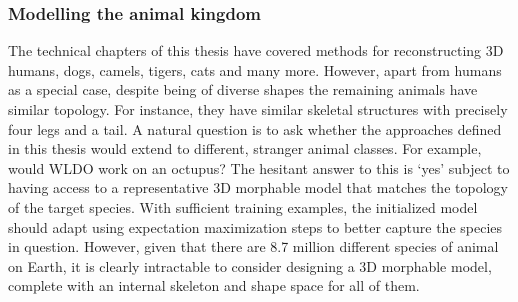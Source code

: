 





\subsubsection{Modelling the animal kingdom}


The technical chapters of this thesis have covered methods for reconstructing 3D humans, dogs, camels, tigers, cats and many more. However, apart from humans as a special case, despite being of diverse shapes the remaining animals have similar topology. For instance, they have similar skeletal structures with precisely four legs and a tail. A natural question is to ask whether the approaches defined in this thesis would extend to different, stranger animal classes. For example, would WLDO work on an octupus? The hesitant answer to this is `yes' subject to having access to a representative 3D morphable model that matches the topology of the target species. With sufficient training examples, the initialized model should adapt using expectation maximization steps to better capture the species in question. However, given that there are 8.7 million different species of animal on Earth, it is clearly intractable to consider designing a 3D morphable model, complete with an internal skeleton and shape space for all of them.

